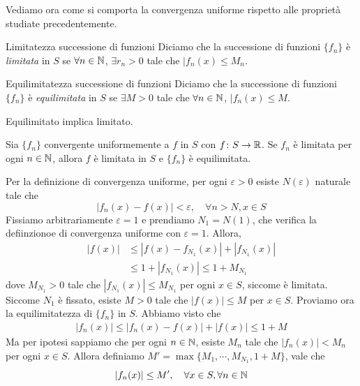 \documentclass[a4paper]{article}
\begin{document}
Vediamo ora come si comporta la convergenza uniforme rispetto
alle proprietà studiate precedentemente.

\begin{snippetdefinition}{Limitatezza successione di funzioni}
    Diciamo che la successione di funzioni \(\{f_n\}\)
    è \emph{limitata} in \(S\) se \(\forall n \in \mathbb{N}\), \(\exists r_n > 0\)
    tale che \(|f_n(x) \leq M_n\).
\end{snippetdefinition}

\begin{snippetdefinition}{Equilimitatezza successione di funzioni}
    Diciamo che la successione di funzioni \(\{f_n\}\)
    è \emph{equilimitata} in \(S\) se \(\exists M > 0\) tale che
    \(\forall n \in \mathbb{N}\), \(|f_n(x) \leq M\).
\end{snippetdefinition}

Equilimitato implica limitato.

\begin{snippetproposition}{}
    Sia \(\{f_n\}\) convergente uniformemente a \(f\) in \(S\)
    con \(f \colon S \to \mathbb{R}\).
    Se \(f_n\) è limitata per ogni \(n \in \mathbb{N}\),
    allora \(f\) è limitata in \(S\) e \(\{f_n\}\) è equilimitata.
\end{snippetproposition}

\begin{snippetproof}{}
    Per la definizione di convergenza uniforme, per ogni \(\varepsilon > 0\)
    esiste \(N(\varepsilon)\) naturale tale che
    \[
        |f_n(x) - f(x)| < \varepsilon, \quad \forall n > N, x \in S
    \]
    Fissiamo arbitrariamente \(\varepsilon = 1\) e prendiamo
    \(N_1 = N(1)\), che verifica la defiinzionoe di convergenza uniforme con \(\varepsilon = 1\).
    Allora,
    \begin{align*}
        |f(x)| &\leq |f(x) - f_{N_1}(x)| + |f_{N_1}(x)| \\
        &\leq 1 + |f_{N_1}(x)| \leq 1 + M_{N_1}
    \end{align*}
    dove \(M_{N_1} > 0\) tale che \(|f_{N_1}(x)| \leq M_{N_1}\) per ogni \(x \in S\), siccome è limitata.
    Siccome \(N_1\) è fissato, esiste \(M>0\) tale che \(|f(x)| \leq M\) per \(x \in S\).
    Proviamo ora la equilimitatezza di \(\{f_n\}\) in \(S\).
    Abbiamo visto che \begin{align*}
        |f_n(x)| \leq |f_n(x) - f(x)| + |f(x)| \leq 1 + M 
    \end{align*}
    Ma per ipotesi sappiamo che per ogni \(n \in \mathbb{N}\),
    esiste \(M_n\) tale che \(|f_n(x)| < M_n\) per ogni \(x \in S\).
    Allora definiamo \(M' = \max\{M_1, \cdots, M_{N_1}, 1 + M\}\), vale che
    \[
        |f_n(x)| \leq M', \quad \forall x \in S, \forall n \in \mathbb{N}
    \]
\end{snippetproof}
\end{document}
